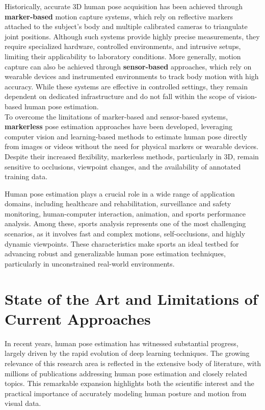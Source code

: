 Historically, accurate 3D human pose acquisition has been achieved through \textbf{marker-based} motion capture systems, which rely on reflective markers attached to the subject's body and multiple calibrated cameras to triangulate 
joint positions.
Although such systems provide highly precise measurements, they require specialized hardware, controlled environments, and intrusive setups, limiting their applicability to laboratory conditions.
More generally, motion capture can also be achieved through \textbf{sensor-based} approaches, which rely on wearable devices and instrumented environments to track body motion with high accuracy.
While these systems are effective in controlled settings, they remain dependent on dedicated infrastructure and do not fall within the scope of vision-based human pose estimation.\\
To overcome the limitations of marker-based and sensor-based systems, \textbf{markerless} pose estimation approaches have been developed, leveraging computer vision and learning-based methods to estimate human pose directly from images or videos without the need for physical markers or wearable devices.
Despite their increased flexibility, markerless methods, particularly in 3D, remain sensitive to occlusions, viewpoint changes, and the availability of annotated training data.

Human pose estimation plays a crucial role in a wide range of application domains, including healthcare and rehabilitation, surveillance and safety monitoring, human-computer interaction, animation, and sports performance analysis.
Among these, sports analysis represents one of the most challenging scenarios, as it involves fast and complex motions, self-occlusions, and highly dynamic viewpoints.
These characteristics make sports an ideal testbed for advancing robust and generalizable human pose estimation techniques, particularly in unconstrained real-world environments.


\section{State of the Art and Limitations of Current Approaches}

In recent years, human pose estimation has witnessed substantial progress, largely driven by the rapid evolution of deep learning techniques. 
The growing relevance of this research area is reflected in the extensive body of literature, with millions of publications addressing human pose estimation and closely related topics.
This remarkable expansion highlights both the scientific interest and the practical importance of accurately modeling human posture and motion from visual data.

